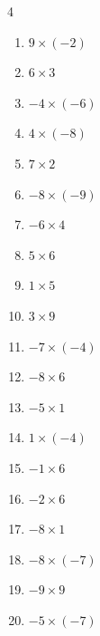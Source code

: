 \begin{multicols}{4}
\begin{enumerate}
  \item $9\times (-2)$
        \phantom{$=-18$}

  \item $6\times 3$
        \phantom{$=18$}

  \item $-4\times (-6)$
        \phantom{$=24$}

  \item $4\times (-8)$
        \phantom{$=-32$}

  \item $7\times 2$
        \phantom{$=14$}

  \item $-8\times (-9)$
        \phantom{$=72$}

  \item $-6\times 4$
        \phantom{$=-24$}

  \item $5\times 6$
        \phantom{$=30$}

  \item $1\times 5$
        \phantom{$=5$}

  \item $3\times 9$
        \phantom{$=27$}

  \item $-7\times (-4)$
        \phantom{$=28$}

  \item $-8\times 6$
        \phantom{$=-48$}

  \item $-5\times 1$
        \phantom{$=-5$}

  \item $1\times (-4)$
        \phantom{$=-4$}

  \item $-1\times 6$
        \phantom{$=-6$}

  \item $-2\times 6$
        \phantom{$=-12$}

  \item $-8\times 1$
        \phantom{$=-8$}

\columnbreak %

  \item $-8\times (-7)$
        \phantom{$=56$}

  \item $-9\times 9$
        \phantom{$=-81$}

  \item $-5\times (-7)$
        \phantom{$=35$}


\end{enumerate}
\end{multicols}
